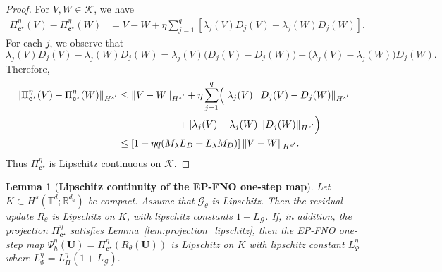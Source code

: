 \documentclass[11pt,a4paper]{article}
\newtheorem{lemma}[theorem]{Lemma}
\theoremstyle{definition}
\theoremstyle{remark}
\numberwithin{equation}{section}
\numberwithin{figure}{section}
\numberwithin{table}{section}
\begin{document}
\begin{proof}
For \(V,W\in\mathcal K\), we have
\[
\begin{aligned}
    \Pi_{\mathbf c^\star}^{\eta}(V)-\Pi_{\mathbf c^\star}^{\eta}(W)
    &=
    V-W
    +
    \eta\sum_{j=1}^{q}
    \left[
    \lambda_j(V)D_j(V)-\lambda_j(W)D_j(W)
    \right].
\end{aligned}
\]
For each \(j\), we observe that 
\[
    \lambda_j(V)D_j(V)-\lambda_j(W)D_j(W)
    =
    \lambda_j(V)\bigl(D_j(V)-D_j(W)\bigr)
    +
    \bigl(\lambda_j(V)-\lambda_j(W)\bigr)D_j(W).
\]
Therefore,
\[
\begin{aligned}
    \|\Pi_{\mathbf c^\star}^{\eta}(V)-\Pi_{\mathbf c^\star}^{\eta}(W)\|_{H^{s'}}
    &\le
    \|V-W\|_{H^{s'}}
    +
    \eta\sum_{j=1}^{q}
    \Bigl(
    |\lambda_j(V)|\|D_j(V)-D_j(W)\|_{H^{s'}} \\
    &\qquad\qquad\qquad
    +
    |\lambda_j(V)-\lambda_j(W)|\|D_j(W)\|_{H^{s'}}
    \Bigr) \\
    &\le
    \left[
    1+\eta q(M_\lambda L_D+L_\lambda M_D)
    \right]
    \|V-W\|_{H^{s'}} .
\end{aligned}
\]
Thus \(\Pi_{\mathbf c^\star}^{\eta}\) is Lipschitz continuous on \(\mathcal K\).
\end{proof}
\begin{lemma}[\textbf{Lipschitz continuity of the EP-FNO one-step map}]
\label{lem:epfno_map_lipschitz}
Let \(K\subset H^s(\mathbb T^d;\mathbb R^{d_a})\) be compact. Assume that \(\mathcal G_\theta\) is Lipschitz.
Then the residual update \(R_\theta\) is Lipschitz on \(K\), with lipschitz constants  $1+L_\mathcal G$.
If, in addition, the projection \(\Pi_{\mathbf c^\star}^{\eta}\) satisfies
Lemma~\ref{lem:projection_lipschitz}, then the EP-FNO one-step map
$
    \Psi_h^\eta(\mathbf U)
    =
    \Pi_{\mathbf c^\star}^{\eta}
    \left(
    R_\theta(\mathbf U)
    \right)
$
is Lipschitz on \(K\) with lipschitz constant  $L_\Psi^\eta$ 
where
$
    L_\Psi^\eta
    =
    L_\Pi^\eta(1+L_{\mathcal G}).
$
\end{lemma}
\end{document}
